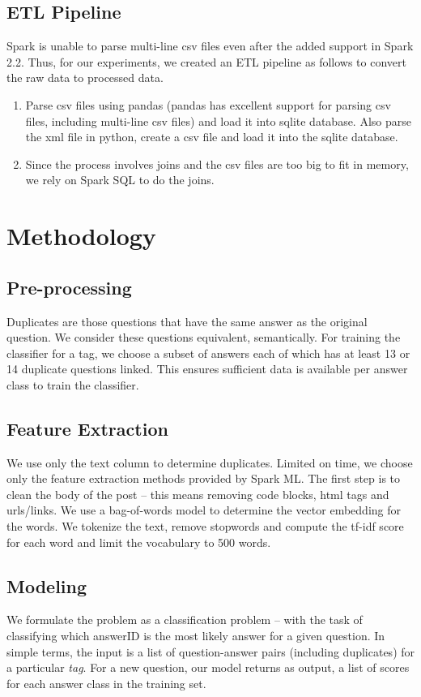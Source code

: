\documentclass{article}
\begin{document}
\subsection{ETL Pipeline}
Spark is unable to parse multi-line csv files even after the added support in Spark 2.2. Thus, for our experiments, we created an ETL pipeline as follows to convert the raw data to processed data.
\begin{enumerate}
	\item Parse csv files using pandas (pandas has excellent support for parsing csv files, including multi-line csv files) and load it into sqlite database. Also parse the xml file in python, create a csv file and load it into the sqlite database.
	\item Since the process involves joins and the csv files are too big to fit in memory, we rely on Spark SQL to do the joins.
\end{enumerate}

\section{Methodology}
\subsection{Pre-processing}
Duplicates are those questions that have the same answer as the original question. We consider these questions equivalent, semantically. For training the classifier for a tag, we choose a subset of answers each of which has at least 13 or 14 duplicate questions linked. This ensures sufficient data is available per answer class to train the classifier.

\subsection{Feature Extraction}
We use only the text column to determine duplicates. Limited on time, we choose only the feature extraction methods provided by Spark ML. The first step is to clean the body of the post -- this means removing code blocks, html tags and urls/links. We use a bag-of-words model to determine the vector embedding for the words. We tokenize the text, remove stopwords and compute the tf-idf score for each word and limit the vocabulary to 500 words.

\subsection{Modeling}
We formulate the problem as a classification problem -- with the task of classifying which answerID is the most likely answer for a given question. In simple terms, the input is a list of question-answer pairs (including duplicates) for a particular \textit{tag}. For a new question, our model returns as output, a list of scores for each answer class in the training set.\\
\end{document}

